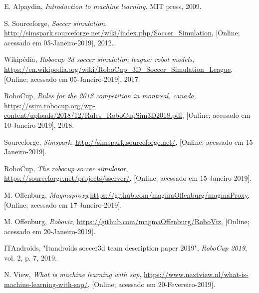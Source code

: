 \documentclass[a4paper,12pt]{article}
\begin{document}
\begin{thebibliography}{10}

 E. Alpaydin, \textit{Introduction to machine learning}. MIT press, 2009.

 S. Sourceforge, \textit{Soccer simulation}, \url{http://simspark.sourceforge.net/wiki/index.php/Soccer_Simulation}, [Online; acessado em 05-Janeiro-2019], 2012.

 Wikipédia, \textit{Robocup 3d soccer simulation league: robot models}, \url{https://en.wikipedia.org/wiki/RoboCup_3D_Soccer_Simulation_League}, [Online; acessado em 05-Janeiro-2019], 2017.

 RoboCup, \textit{Rules for the 2018 competition in montreal, canada}, \url{https://ssim.robocup.org/wp-content/uploads/2018/12/Rules_RoboCupSim3D2018.pdf}, [Online; acessado em 10-Janeiro-2019], 2018.

 Sourceforge, \textit{Simspark}, \url{http://simspark.sourceforge.net/}, [Online; acessado em 15-Janeiro-2019].

 RoboCup, \textit{The robocup soccer simulator}, \url{https://sourceforge.net/projects/sserver/}, [Online; acessado em 15-Janeiro-2019].

 M. Offenburg, \textit{Magmaproxy},\url{https://github.com/magmaOffenburg/magmaProxy}, [Online; acessado em 17-Janeiro-2019].

 M. Offenburg, \textit{Roboviz}, \url{https://github.com/magmaOffenburg/RoboViz}, [Online; acessado
em 20-Janeiro-2019].

 ITAndroids, "Itandroids soccer3d team description paper 2019", \textit{RoboCup 2019}, vol.
2, p. 7, 2019.

 N. View, \textit{What is machine learning with sap}, \url{https://www.nextview.nl/what-is-machine-learning-with-sap/}, [Online; acessado em 20-Fevereiro-2019].

\end{thebibliography}

\printbibliography
\end{document}
